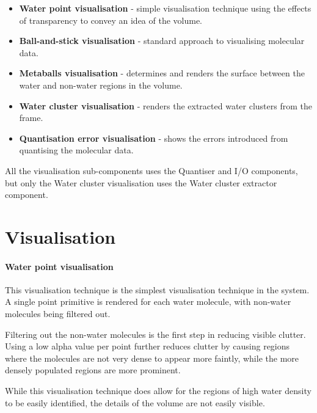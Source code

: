 \begin{itemize}

  \item \textbf{Water point visualisation} - simple visualisation technique
  using the effects of transparency to convey an idea of the volume.

  \item \textbf{Ball-and-stick visualisation} - standard approach to
  visualising molecular data.

  \item \textbf{Metaballs visualisation} - determines and renders the surface
  between the water and non-water regions in the volume.

  \item \textbf{Water cluster visualisation} - renders the extracted water
  clusters from the frame.

  \item \textbf{Quantisation error visualisation} - shows the errors introduced
  from quantising the molecular data.

\end{itemize}

All the visualisation sub-components uses the Quantiser and I/O components, but
only the Water cluster visualisation uses the Water cluster extractor
component.



\section{Visualisation}
\label{sec:design_visualisation}

\paragraph{Water point visualisation}

This visualisation technique is the simplest visualisation technique in the
system. A single point primitive is rendered for each water molecule, with
non-water molecules being filtered out.

Filtering out the non-water molecules is the first step in reducing visible
clutter. Using a low alpha value per point further reduces clutter by causing
regions where the molecules are not very dense to appear more faintly, while
the more densely populated regions are more prominent.

While this visualisation technique does allow for the regions of high water
density to be easily identified, the details of the volume are not easily
visible.

